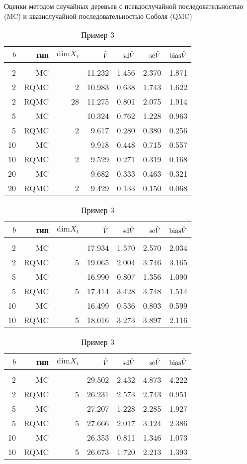 \begin{table}
    \renewcommand{\arraystretch}{0.6}
    \centering
    Оценки методом случайных деревьев с псевдослучайной последовательностью (MC) и квазислучайной последовательностью Соболя (QMC)
    \caption{Пример 1}\label{tbl:random_tree_sobol_ex1}
    \begin{tabular}{rrrrrrr}
        $b$&тип&$\mathrm{dim} X_t$&$\hat{V}$&$\mathrm{sd}\hat{V}$&$\mathrm{se}\hat{V}$&$\mathrm{bias}\hat{V}$\\[3pt]\hline\\[-8pt]
        2&MC&&11.232&1.456&2.370&1.871\\
        2&RQMC&2&10.983&0.638&1.743&1.622\\
        2&RQMC&28&11.275&0.801&2.075&1.914\\[3pt]
        5&MC&&10.324&0.762&1.228&0.963\\
        5&RQMC&2&9.617&0.280&0.380&0.256\\[3pt]
        10&MC&&9.918&0.448&0.715&0.557\\
        10&RQMC&2&9.529&0.271&0.319&0.168\\[3pt]
        20&MC&&9.682&0.333&0.463&0.321\\
		20&RQMC&2&9.429&0.133&0.150&0.068\\[3pt]
    \end{tabular}

    \caption{Пример 2}\label{tbl:random_tree_sobol_ex2}
    \begin{tabular}{rrrrrrr}
        $b$&тип&$\mathrm{dim} X_t$&$\hat{V}$&$\mathrm{sd}\hat{V}$&$\mathrm{se}\hat{V}$&$\mathrm{bias}\hat{V}$\\[3pt]\hline\\[-8pt]
        2&MC&&17.934&1.570&2.570&2.034\\
        2&RQMC&5&19.065&2.004&3.746&3.165\\[3pt]
        5&MC&&16.990&0.807&1.356&1.090\\
        5&RQMC&5&17.414&3.428&3.748&1.514\\[3pt]
        10&MC&&16.499&0.536&0.803&0.599\\
        10&RQMC&5&18.016&3.273&3.897&2.116\\[3pt]
    \end{tabular}

    \caption{Пример 3}\label{tbl:random_tree_sobol_ex3}
    \begin{tabular}{rrrrrrr}
        $b$&тип&$\mathrm{dim} X_t$&$\hat{V}$&$\mathrm{sd}\hat{V}$&$\mathrm{se}\hat{V}$&$\mathrm{bias}\hat{V}$\\[3pt]\hline\\[-8pt]
        2&MC&&29.502&2.432&4.873&4.222\\
        2&RQMC&5&26.231&2.573&2.743&0.951\\[3pt]
        5&MC&&27.207&1.228&2.285&1.927\\
        5&RQMC&5&27.666&2.017&3.124&2.386\\[3pt]
        10&MC&&26.353&0.811&1.346&1.073\\
        10&RQMC&5&26.673&1.720&2.213&1.393\\[3pt]
    \end{tabular}
\end{table}

